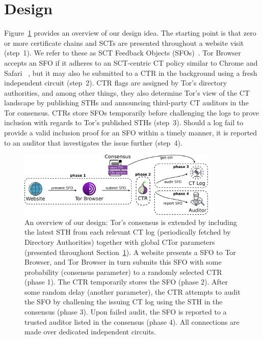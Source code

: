 \section{Design}
\label{sec:design}
Figure~\ref{fig:overview} provides an overview of our design idea.  The starting
point is that zero or more certificate chains and SCTs are presented
throughout a website visit (step~1).  We refer to these as SCT Feedback Objects
(SFOs)~\cite{nordberg}.  Tor Browser accepts an SFO if it adheres to an
SCT-centric CT policy similar to Chrome and Safari~%
\cite{chrome-policy,safari-policy}, but it may also be submitted to a CTR
in the background using a fresh independent circuit (step~2).  CTR flags are
assigned by Tor's directory authorities, and among other things, they also
determine Tor's view of the CT landscape by publishing STHs and announcing
third-party CT auditors in the Tor consensus.  CTRs store SFOs temporarily
before challenging the logs to prove inclusion with regards to Tor's published
STHs (step~3).  Should a log fail to provide a valid inclusion proof for an SFO
within a timely manner, it is reported to an auditor that investigates the issue
further (step~4).
\begin{figure}
	\centering
	\includegraphics[width=0.85\textwidth]{img/setting-with-consensus}
	\caption{An overview of our design: Tor's consensus is extended by including
		the latest STH from each relevant CT log (periodically fetched by
		Directory Authorities) together with global CTor parameters (presented
		throughout Section~\ref{sec:design}). A website presents a SFO to Tor
		Browser, and Tor Browser in turn submits this SFO with some probability
		(consensus parameter) to a randomly selected CTR (phase 1). The CTR
		temporarily stores the SFO (phase 2). After some random delay (another
		parameter), the CTR attempts to audit the SFO by challening the issuing
		CT log using the STH in the consensus (phase 3). Upon failed audit, the
		SFO is reported to a trusted auditor listed in the consensus (phase 4).
		All connections are made over dedicated independent circuits.}
	\label{fig:overview}
\end{figure}

